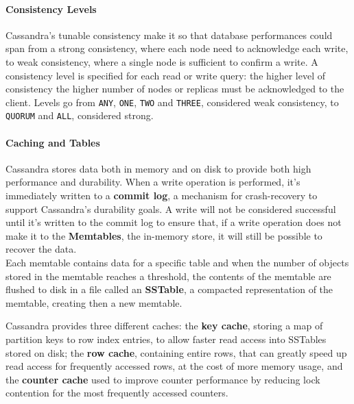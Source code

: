 \paragraph{Consistency Levels} Cassandra's tunable consistency make it so that database performances could span from a strong consistency, where each node need to acknowledge each write, to weak consistency, where a single node is sufficient to confirm a write. A consistency level is specified for each read or write query: the higher level of consistency the higher number of nodes or replicas must be acknowledged to the client. Levels go from \texttt{ANY}, \texttt{ONE}, \texttt{TWO} and \texttt{THREE}, considered weak consistency, to \texttt{QUORUM} and \texttt{ALL}, considered strong.

\paragraph{Caching and Tables} Cassandra stores data both in memory and on disk to provide both high performance and durability. When a write operation is performed, it’s immediately written to a \textbf{commit log}, a mechanism for crash-recovery to support Cassandra’s durability goals. A write will not be considered successful until it’s written to the commit log to ensure that, if a write operation does not make it to the \textbf{Memtables}, the in-memory store, it will still be possible to recover the data. 
\\Each memtable contains data for a specific table and when the number of objects stored in the memtable reaches a threshold, the contents of the memtable are flushed to disk in a file called an \textbf{SSTable}, a compacted representation of the memtable, creating then a new memtable.

Cassandra provides three different caches: the \textbf{key cache}, storing a map of partition keys to row index entries, to allow faster read access into SSTables stored on disk; the \textbf{row cache}, containing entire rows, that can greatly speed up read access for frequently accessed rows, at the cost of more memory usage, and the \textbf{counter cache} used to improve counter performance by reducing lock contention for the most frequently accessed counters.

